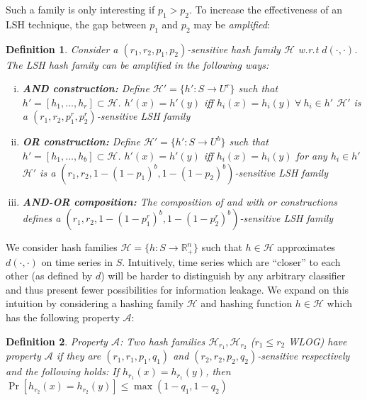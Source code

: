 \documentclass[a4paper]{article}
\newtheorem{definition}{Definition}
\begin{document}
Such a family is only interesting if $p_1 > p_2$.
To increase the effectiveness of an LSH technique, the gap between $p_1$ and $p_2$ may be \textit{amplified}:

\begin{definition}\label{defn:lsh_amplification}
    Consider a $(r_1, r_2, p_1, p_2)$-sensitive hash family $\mathcal{H}$ w.r.t $d(\cdot,\cdot)$. The LSH hash family can be amplified in the following ways:
    \begin{enumerate}[(i)]
        \item \textbf{AND construction:} Define $\mathcal{H}' = \{h' : S \rightarrow U^r\}$ such that $h' = [h_1, \ldots, h_r] \subset \mathcal{H}$.
            $h'(x) = h'(y)$ iff $h_i(x) = h_i(y) ~\forall~h_i \in h'$
            $\mathcal{H'}$ is a $(r_1, r_2, p_1^r, p_2^r)$-sensitive LSH family
        \item \textbf{OR construction:} Define $\mathcal{H}' = \{h' : S \rightarrow U^b\}$ such that $h' = [h_1, \ldots, h_b] \subset \mathcal{H}$.
            $h'(x) = h'(y)$ iff $h_i(x) = h_i(y)$ for any $h_i \in h'$
            $\mathcal{H'}$ is a $(r_1, r_2, 1-{(1-p_1)}^b, 1-{(1-p_2)}^b)$-sensitive LSH family
        \item \textbf{AND-OR composition:} The composition of \textnormal{and} with \textnormal{or} constructions defines a $(r_1, r_2, 1-{(1-p_1^r)}^b, 1-{(1-p_2^r)}^b)$-sensitive LSH family
    \end{enumerate}
\end{definition}

We consider hash families $\mathcal{H} = \{h : S \rightarrow \mathbb{R}_{+}^n\}$ such that $h \in \mathcal{H}$ approximates $d(\cdot,\cdot)$ on time series in $S$.
Intuitively, time series which are ``closer'' to each other (as defined by $d$) will be harder to distinguish by any arbitrary classifier and thus present fewer possibilities for information leakage.
We expand on this intuition by considering a hashing family $\mathcal{H}$ and hashing function $h \in \mathcal{H}$ which has the following property $\mathscr{A}$:


\begin{definition}\label{defn:property_alpha}
    Property $\mathscr{A}$:
    Two hash families $\mathcal{H}_{r_1}, \mathcal{H}_{r_2}$ ($r_1 \le r_2$ \textnormal{WLOG}) have property $\mathscr{A}$ if they are $(r_1, r_1, p_1, q_1)$ and $(r_2, r_2, p_2, q_2)$-sensitive respectively and the following holds:
    If $h_{r_1}(x) = h_{r_1}(y)$, then $\Pr[h_{r_2}(x) = h_{r_2}(y)] \le \max(1 - q_1, 1 - q_2)$
\end{definition}
\end{document}
